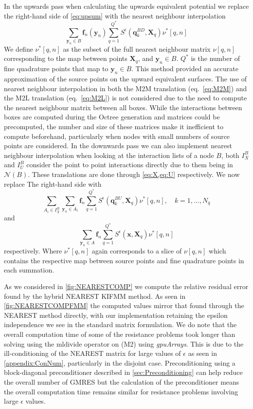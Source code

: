 In the upwards pass when calculating the upwards equivalent potential we replace the right-hand side of \cref{eq:upsum} with the nearest neighbour interpolation
\begin{equation*}
    \sum_{{\bm{y}}_{n} \in B} \bm{f}_{n}({\bm{y}}_n) \sum_{q=1}^{Q^*}S^{\epsilon}\left({\bm{q}}^{BD}_{k}, {\bm{X}}_{q}\right) \nu^*[q,n]
\end{equation*}
We define $\nu^*[q,n]$ as the subset of the full nearest neighbour matrix $\nu[q,n]$ corresponding to the map between points ${\bm{X}}_{q}$, and ${\bm{y}}_{n} \in B$. $Q^*$ is the number of fine quadrature points that map to ${\bm{y}}_{n} \in B$. This method provided an accurate approximation of the source points on the upward equivalent surfaces. The use of nearest neighbour interpolation in both the M2M translation (eq.~\ref{eq:M2M}) and the M2L translation (eq.~\ref{eq:M2L}) is not considered due to the need to compute the nearest neighbour matrix between all boxes. While the interactions between boxes are computed during the Octree generation and matrices could be precomputed, the number and size of these matrices make it inefficient to compute beforehand, particularly when nodes with small numbers of source points are considered. 
In the downwards pass we can also implement nearest neighbour interpolation when looking at the interaction lists of a node $B$, both $I_X^B$ and $I_U^B$ consider the point to point interactions directly due to them being in $\mathcal{N}(B)$. These translations are done through \cref{eq:X,eq:U} respectively. We now replace The right-hand side with 
\begin{equation*}
    \sum_{A_i \in I_X^B} \sum_{{\bm{y}}_n\in A_i} {\bm{f}}_{n} \sum_{q=1}^{Q^*} S^\epsilon\left(\bm{q}^{BU}_{k}, {\bm{X}}_{q}\right) \nu^*[q,n], \quad k=1,\dots,N_q
\end{equation*}
and
\begin{equation*}
    \sum_{{\bm{y}}_n\in A}{\bm{f}}_n \sum_{q=1}^{Q^*} S^\epsilon(\bm{x},{\bm{X}}_q) \nu^*[q,n]
\end{equation*}
respectively. Where $\nu^*[q,n]$ again corresponds to a slice of $\nu[q,n]$ which contains the respective map between source points and fine quadrature points in each summation.

As we considered in \cref{fig:NEARESTCOMP} we compute the relative residual error found by the hybrid NEAREST KIFMM method. As seen in \cref{fig:NEARESTCOMPFMM} the computed values mirror that found through the NEAREST method directly, with our implementation retaining the epsilon independence we see in the standard matrix formulation. We do note that the overall computation time of some of the resistance problems took longer than solving using the mldivide operator on (M2) using \textit{gpuArrays}. This is due to the ill-conditioning of the NEAREST matrix for large values of $\epsilon$ as seen in \cref{appendix:ConNum}, particularly in the disjoint case. Preconditioning using a block-diagonal preconditioner described in \cref{sec:Preconditioning} can help reduce the overall number of GMRES but the calculation of the preconditioner means the overall computation time remains similar for resistance problems involving large $\epsilon$ values. 

